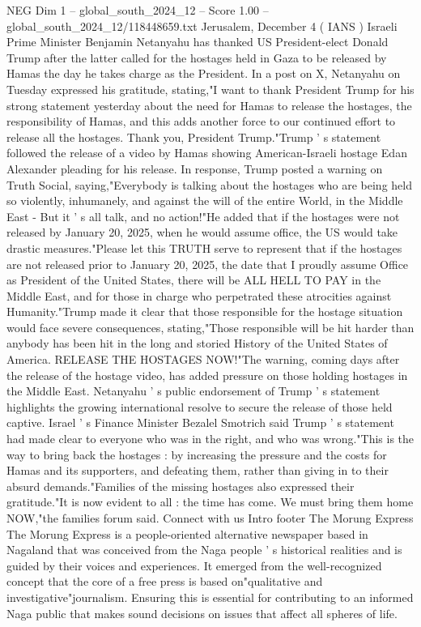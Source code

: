 \begin{textsample}{NEG Dim 1 – global\_south\_2024\_12 – Score 1.00 – global\_south\_2024\_12/118448659.txt}  \label{ex:f1_neg_340}
Jerusalem, December 4 ( IANS ) Israeli Prime Minister Benjamin Netanyahu has thanked US President-elect Donald Trump after the latter called for the hostages held in Gaza to be released by Hamas the day he takes charge as the President.
In a post on X, Netanyahu on Tuesday expressed his gratitude, stating,"I want to thank President Trump for his strong statement yesterday about the need for Hamas to release the hostages, the responsibility of Hamas, and this adds another force to our continued effort to release all the hostages.
Thank you, President Trump."Trump ' s statement followed the release of a video by Hamas showing American-Israeli hostage Edan Alexander pleading for his release.
In response, Trump posted a warning on Truth Social, saying,"Everybody is talking about the hostages who are being held so violently, inhumanely, and against the will of the entire World, in the Middle East - But it ' s all talk, and no action!"He added that if the hostages were not released by January 20, 2025, when he would assume office, the US would take drastic measures."Please let this TRUTH serve to represent that if the hostages are not released prior to January 20, 2025, the date that I proudly assume Office as President of the United States, there will be ALL HELL TO PAY in the Middle East, and for those in charge who perpetrated these atrocities against Humanity."Trump made it clear that those responsible for the hostage situation would face severe consequences, stating,"Those responsible will be hit harder than anybody has been hit in the long and storied History of the United States of America.
RELEASE THE HOSTAGES NOW!"The warning, coming days after the release of the hostage video, has added pressure on those holding hostages in the Middle East.
Netanyahu ' s public endorsement of Trump ' s statement highlights the growing international resolve to secure the release of those held captive.
Israel ' s Finance Minister Bezalel Smotrich said Trump ' s statement had made clear to everyone who was in the right, and who was wrong."This is the way to bring back the hostages : by increasing the pressure and the costs for Hamas and its supporters, and defeating them, rather than giving in to their absurd demands."Families of the missing hostages also expressed their gratitude."It is now evident to all : the time has come.
We must bring them home NOW,"the families forum said.
Connect with us Intro footer The Morung Express The Morung Express is a people-oriented alternative newspaper based in Nagaland that was conceived from the Naga people ' s historical realities and is guided by their voices and experiences.
It emerged from the well-recognized concept that the core of a free press is based on"qualitative and investigative"journalism.
Ensuring this is essential for contributing to an informed Naga public that makes sound decisions on issues that affect all spheres of life.

\end{textsample}
